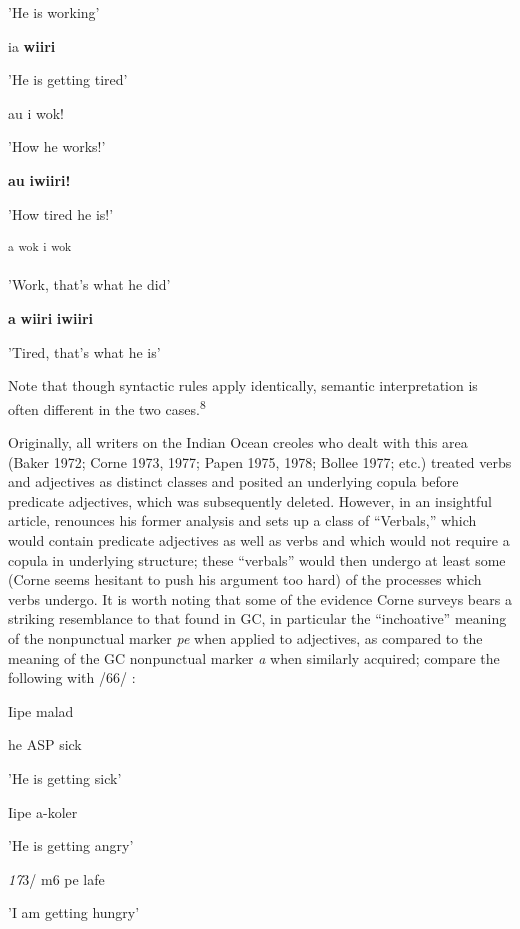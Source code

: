 'He is working'

\ea\label{ex:66}
ia \textbf{wiiri}
\glt
\z

'He is getting tired'

\ea\label{ex:67}
au i wok!
\glt
\z

'How he works!'

\ea\label{ex:68}
\textbf{au} \textbf{i}\textbf{wiiri!}
\glt
\z

'How tired he is!'

\ea\label{ex:69}
 \textsuperscript{a} \textsuperscript{wok} \textsuperscript{i} \textsuperscript{wok}
\glt
\z

'Work, that's what he did'

\ea\label{ex:70}
\textbf{a} \textbf{wiiri} \textbf{i}\textbf{wiiri}
\glt
\z

'Tired, that's what he is' 


Note that though syntactic rules apply identically, semantic interpre\-tation is often different in the two cases.\textsuperscript{8}

Originally, all writers on the Indian Ocean creoles who dealt with this area (Baker 1972; Corne 1973, 1977; Papen 1975, 1978; Bollee 1977; etc.) treated verbs and adjectives as distinct classes and posited an underlying copula before predicate adjectives, which was subsequently deleted. However, in an insightful article, \citet{Corne1981} renounces his former analysis and sets up a class of ``Verbals,'' which would contain predicate adjectives as well as verbs and which would not require a copula in underlying structure; these ``verbals'' would then undergo at least some (Corne seems hesitant to push his argument too hard) of the processes which verbs undergo. It is worth noting that some of the evidence Corne surveys bears a striking resemblance to that found in GC, in particular the ``inchoative'' meaning of the nonpunctual marker \textit{pe} when applied to adjectives, as compared to the meaning of the GC nonpunctual marker \textit{a} when similarly acquired; compare the following with /66/ :

\ea\label{ex:71}
 Iipe malad
\glt
\z

he ASP sick

'He is getting sick'

\ea\label{ex:72}
 Iipe a-koler
\glt
\z

'He is getting angry'

\textit{17}3/ m6 pe lafe

'I am getting hungry'

